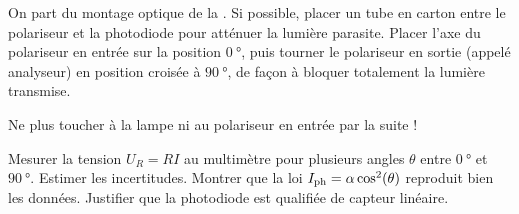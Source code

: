 \begin{protocole}
\item On part du montage optique de la . Si possible, placer un tube en carton entre le polariseur et la photodiode pour atténuer la lumière parasite. Placer l’axe du polariseur en entrée sur la position $\SI{0}{\degree}$, puis tourner le polariseur en sortie (appelé analyseur) en position croisée à $\SI{90}{\degree}$, de façon à bloquer totalement la
lumière transmise.
\begin{danger}
Ne plus toucher à la lampe ni au polariseur en entrée par la suite !
\end{danger}
\item Mesurer la tension $U_R = R I$ au multimètre pour plusieurs angles $\theta$ entre $\SI{0}{\degree}$ et $\SI{90}{\degree}$. Estimer les incertitudes. Montrer que la loi $I_{\rm ph} = \alpha \cos^2(\theta)$ reproduit bien les données. Justifier que la photodiode est qualifiée de  capteur linéaire.
%
\end{protocole}
%
%

